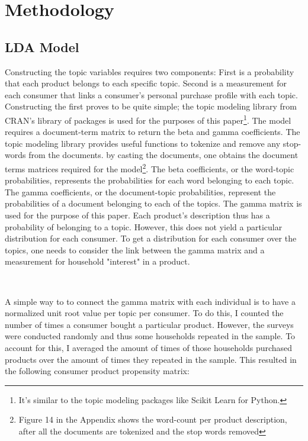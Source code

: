 \section{Methodology} %
\label{sec:methodology}
 
\subsection{LDA Model} %
\label{sub:lda_model}

Constructing the topic variables requires two components: First is a probability that each product belongs to each specific topic. Second is a measurement for each consumer that links a consumer's personal purchase profile with each topic. Constructing the first proves to be quite simple; the topic modeling library \cite{lda} from CRAN's library of packages is used for the purposes of this paper\footnote{It's similar to the topic modeling packages like Scikit Learn for Python.}. The model requires a document-term matrix to return the beta and gamma coefficients. The topic modeling library provides useful functions to tokenize and remove any stop-words from the documents. by casting the documents, one obtains the document terms matrices required for the model\footnote{Figure 14 in the Appendix shows the word-count per product description, after all the documents are tokenized and the stop words removed}. The beta coefficients, or the word-topic probabilities, represents the probabilities for each word belonging to each topic. The gamma coefficients, or the document-topic probabilities, represent the probabilities of a document belonging to each of the topics. The gamma matrix is used for the purpose of this paper. Each product's description thus has a probability of belonging to a topic. However, this does not yield a particular distribution for each consumer. To get a distribution for each consumer over the topics, one needs to consider the link between the gamma matrix and a measurement for household "interest" in a product. 

\

A simple way to to connect the gamma matrix with each individual is to have a normalized unit root value per topic per consumer. To do this, I counted the number of times a consumer bought a particular product. However, the surveys were conducted randomly and thus some households repeated in the sample. To account for this, I averaged the amount of times of those households purchased products over the amount of times they repeated in the sample. This resulted in the following consumer product propensity matrix:


